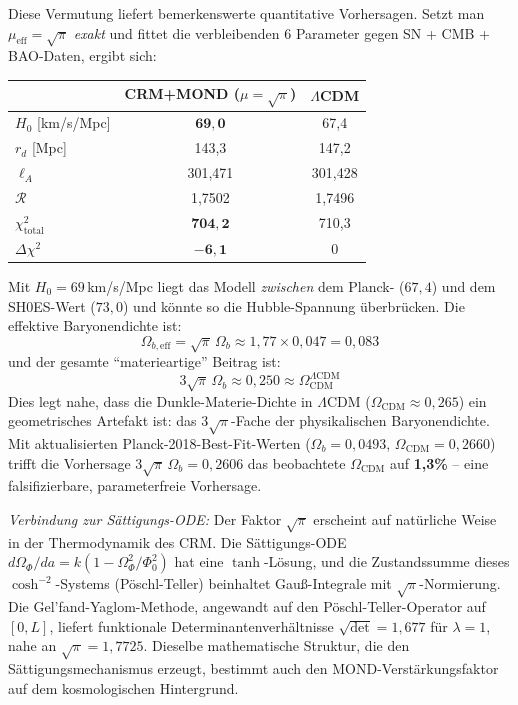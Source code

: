 \documentclass[aps,prd,twocolumn,superscriptaddress,nofootinbib,floatfix]{revtex4-2}
\begin{document}
Diese Vermutung liefert bemerkenswerte quantitative Vorhersagen. Setzt man $\mu_{\mathrm{eff}} = \sqrt{\pi}$ \textit{exakt} und fittet die verbleibenden 6 Parameter gegen SN + CMB + BAO-Daten, ergibt sich:
\begin{center}
\begin{tabular}{lcc}
\toprule
& CRM+MOND ($\mu = \sqrt{\pi}$) & $\Lambda$CDM \\
\midrule
$H_0$ [km/s/Mpc] & $\mathbf{69{,}0}$ & 67,4 \\
$r_d$ [Mpc] & 143,3 & 147,2 \\
$\ell_A$ & 301,471 & 301,428 \\
$\mathcal{R}$ & 1,7502 & 1,7496 \\
$\chi^2_{\mathrm{total}}$ & $\mathbf{704{,}2}$ & 710,3 \\
$\Delta\chi^2$ & $\mathbf{-6{,}1}$ & 0 \\
\bottomrule
\end{tabular}
\end{center}
Mit $H_0 = 69$\,km/s/Mpc liegt das Modell \textit{zwischen} dem Planck- ($67{,}4$) und dem SH0ES-Wert ($73{,}0$) und könnte so die Hubble-Spannung überbrücken. Die effektive Baryonendichte ist:
\begin{equation}
\Omega_{b,\mathrm{eff}} = \sqrt{\pi}\,\Omega_b \approx 1{,}77 \times 0{,}047 = 0{,}083
\end{equation}
und der gesamte "`materieartige"' Beitrag ist:
\begin{equation}
3\sqrt{\pi}\,\Omega_b \approx 0{,}250 \approx \Omega_{\mathrm{CDM}}^{\Lambda\mathrm{CDM}}
\end{equation}
Dies legt nahe, dass die Dunkle-Materie-Dichte in $\Lambda$CDM ($\Omega_{\mathrm{CDM}} \approx 0{,}265$) ein geometrisches Artefakt ist: das $3\sqrt{\pi}$-Fache der physikalischen Baryonendichte. Mit aktualisierten Planck-2018-Best-Fit-Werten ($\Omega_b = 0{,}0493$, $\Omega_{\mathrm{CDM}} = 0{,}2660$) trifft die Vorhersage $3\sqrt{\pi}\,\Omega_b = 0{,}2606$ das beobachtete $\Omega_{\mathrm{CDM}}$ auf \textbf{1,3\%} -- eine falsifizierbare, parameterfreie Vorhersage.

\textit{Verbindung zur Sättigungs-ODE:} Der Faktor $\sqrt{\pi}$ erscheint auf natürliche Weise in der Thermodynamik des CRM. Die Sättigungs-ODE $d\Omega_\Phi/da = k(1 - \Omega_\Phi^2/\Phi_0^2)$ hat eine $\tanh$-Lösung, und die Zustandssumme dieses $\cosh^{-2}$-Systems (Pöschl-Teller) beinhaltet Gauß-Integrale mit $\sqrt{\pi}$-Normierung. Die Gel'fand-Yaglom-Methode, angewandt auf den Pöschl-Teller-Operator auf $[0,L]$, liefert funktionale Determinantenverhältnisse $\sqrt{\det} = 1{,}677$ für $\lambda = 1$, nahe an $\sqrt{\pi} = 1{,}7725$. Dieselbe mathematische Struktur, die den Sättigungsmechanismus erzeugt, bestimmt auch den MOND-Verstärkungsfaktor auf dem kosmologischen Hintergrund.
\end{document}
